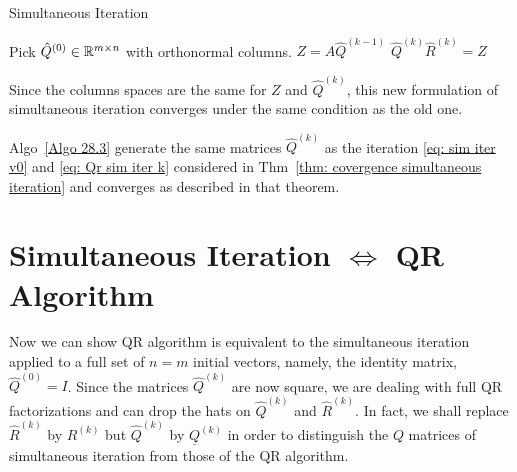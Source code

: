 \begin{algorithm}[H]
    \caption{Simultaneous Iteration}
    \label{Algo 28.3}
    Pick $ \hat Q ^{(0)} \in \mathbb{R}^{m\times n} $ with orthonormal columns. \; 
     {
        $ Z = A\hat Q ^{(k-1)} $\; 
        $ \hat Q ^{(k)} \hat R^{(k)}=Z $  
    }
\end{algorithm}

Since the columns spaces are the same for $Z$ and $\hat Q ^{(k)}$, this new formulation of simultaneous iteration converges under the same condition as the old one.  


\begin{theorem}
\label{thm: Covergence normalize sim iter}
Algo~\ref{Algo 28.3} generate the same matrices $\hat Q^{(k)}$ as the iteration \eqref{eq: sim iter v0} and \eqref{eq: Qr sim iter k} considered in Thm~\ref{thm: covergence simultaneous iteration} and converges as described in that theorem.  
\end{theorem}

\section{Simultaneous Iteration $ \Longleftrightarrow $ QR Algorithm} 
 
Now we can show QR algorithm is equivalent to the simultaneous iteration applied to a full set of $n=m$ initial vectors, namely, the identity matrix, $ \hat Q^{(0)}=I $. Since the matrices $\hat{Q}^{(k)}$ are now square, we are dealing with full QR factorizations and can drop the hats on $\hat{Q}^{(k)}$ and $\hat{R}^{(k)}$. In fact, we shall replace $\hat{R}^{(k)}$ by $R^{(k)}$ but $\hat{Q}^{(k)}$ by $\underline{Q}^{(k)}$ in order to distinguish the $Q$ matrices of simultaneous iteration from those of the $\mathrm{QR}$ algorithm.

